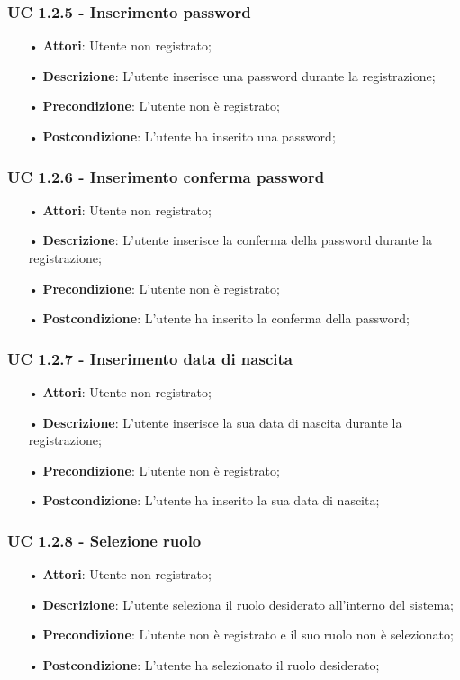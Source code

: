 \subsubsection{UC 1.2.5 - Inserimento password}
\begin{itemize}
	\item[•]\textbf{Attori}: Utente non registrato;
	\item[•]\textbf{Descrizione}: L'utente inserisce una password durante la registrazione;
	\item[•]\textbf{Precondizione}: L'utente non è registrato;
	\item[•]\textbf{Postcondizione}: L'utente ha inserito una password;
\end{itemize}

\subsubsection{UC 1.2.6 - Inserimento conferma password}
\begin{itemize}
	\item[•]\textbf{Attori}: Utente non registrato;
	\item[•]\textbf{Descrizione}: L'utente inserisce la conferma della password durante la registrazione;
	\item[•]\textbf{Precondizione}: L'utente non è registrato;
	\item[•]\textbf{Postcondizione}: L'utente ha inserito la conferma della password;
\end{itemize}

\subsubsection{UC 1.2.7 - Inserimento data di nascita}
\begin{itemize}
	\item[•]\textbf{Attori}: Utente non registrato;
	\item[•]\textbf{Descrizione}: L'utente inserisce la sua data di nascita durante la registrazione;
	\item[•]\textbf{Precondizione}: L'utente non è registrato;
	\item[•]\textbf{Postcondizione}: L'utente ha inserito la sua data di nascita;
\end{itemize}

\subsubsection{UC 1.2.8 - Selezione ruolo}
\begin{itemize}
	\item[•]\textbf{Attori}: Utente non registrato;
	\item[•]\textbf{Descrizione}: L'utente seleziona il ruolo desiderato all'interno del sistema;
	\item[•]\textbf{Precondizione}: L'utente non è registrato e il suo ruolo non è selezionato;
	\item[•]\textbf{Postcondizione}: L'utente ha selezionato il ruolo desiderato;
\end{itemize}
